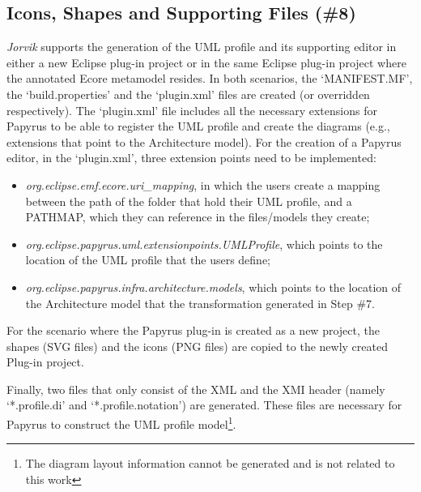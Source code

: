 \subsection{Icons, Shapes and Supporting Files (\#8)}
\label{sec:supportingFiles}
\textit{Jorvik} supports the generation of the UML profile and its supporting editor in either a new Eclipse plug-in project or in the same Eclipse plug-in project where the annotated Ecore metamodel resides. 
In both scenarios, the `MANIFEST.MF', the `build.properties' and the `plugin.xml' files are created (or overridden respectively). 
The `plugin.xml' file includes all the necessary extensions for Papyrus to be able to register the UML profile and create the diagrams (e.g., extensions that point to the Architecture model). 
For the creation of a Papyrus editor, in the `plugin.xml', three extension points need to be implemented:
\begin{itemize}
	\item \textit{org.eclipse.emf.ecore.uri\_mapping}, in which the users create a mapping between the path of the folder that hold their UML profile, and a PATHMAP, which they can reference in the files/models they create;
	\item \textit{org.eclipse.papyrus.uml.extensionpoints.UMLProfile}, which points to the location of the UML profile that the users define;
	\item \textit{org.eclipse.papyrus.infra.architecture.models}, which points to the location of the Architecture model that the transformation generated in Step \#7.
\end{itemize}
For the scenario where the Papyrus plug-in is created as a new project, the shapes (SVG files) and the icons (PNG files) are copied to the newly created Plug-in project. 

Finally, two files that only consist of the XML and the XMI header (namely `*.profile.di' and `*.profile.notation') are generated. 
These files are necessary for Papyrus to construct the UML profile model\footnote{The diagram layout information cannot be generated and is not related to this work}. 

